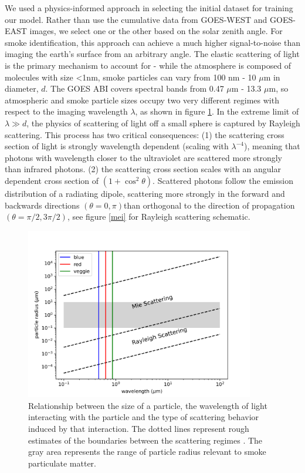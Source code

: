 \documentclass{article}
\begin{document}
We used a physics-informed approach in selecting the initial dataset for training our model. Rather than use the cumulative data from GOES-WEST and GOES-EAST images, we select one or the other based on the solar zenith angle. For smoke identification, this approach can achieve a much higher signal-to-noise than imaging the earth’s surface from an arbitrary angle. The elastic scattering of light is the primary mechanism to account for - while the atmosphere is composed of molecules with size <1nm, smoke particles can vary from 100 nm - 10 \(\mu\)m in diameter, \(d\). The GOES ABI covers spectral bands from 0.47 \(\mu\)m - 13.3 \(\mu\)m, so atmospheric and smoke particle sizes occupy two very different regimes with respect to the imaging wavelength \(\lambda\), as shown in figure \ref{regime}. In the extreme limit of \(\lambda \gg d\), the physics of scattering of light off a small sphere is captured by Rayleigh scattering. This process has two critical consequences: (1) the scattering cross section of light is strongly wavelength dependent (scaling with \(\lambda^{-4}\)), meaning that photons with wavelength closer to the ultraviolet are scattered more strongly than infrared photons. (2) the scattering cross section scales with an angular dependent cross section of \((1 + \cos^2 \theta)\). Scattered photons follow the emission distribution of a radiating dipole, scattering more strongly in the forward and backwards directions \((\theta = 0,\pi)\)than orthogonal to the direction of propagation \((\theta = \pi/2, 3\pi/2)\), see figure \ref{mei} for Rayleigh scattering schematic.

\begin{figure}
    \centering
    \includegraphics[width=10cm]{figures/scatter_regime.png}
    \caption{Relationship between the size of a particle, the wavelength of light interacting with the particle and the type of scattering behavior induced by that interaction. The dotted lines represent rough estimates of the boundaries between the scattering regimes \citep{petty}. The gray area represents the range of particle radius relevant to smoke particulate matter.}\label{regime}
\end{figure}
\end{document}
